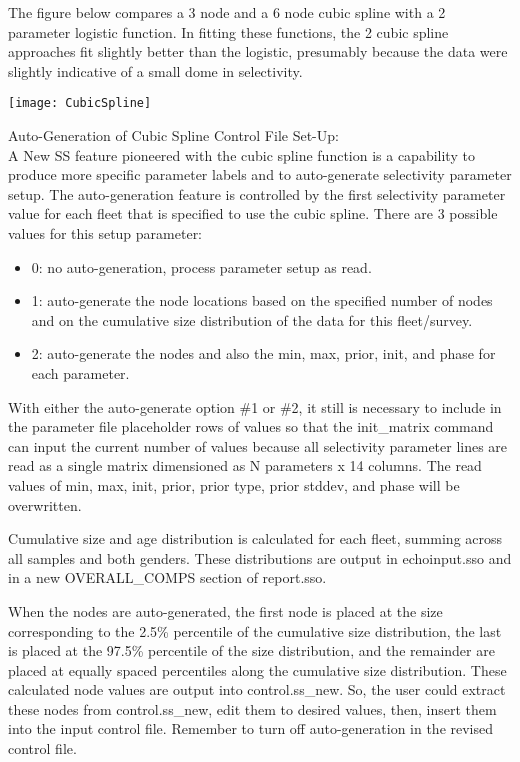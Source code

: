\begin{description}
	
	The figure below compares a 3 node and a 6 node cubic spline with a 2 parameter logistic function.  In fitting these functions, the 2 cubic spline approaches fit slightly better than the logistic, presumably because the data were slightly indicative of a small dome in selectivity.\\
	\begin{center}
		\texttt{[image: CubicSpline]}
	\end{center}
	
	Auto-Generation of Cubic Spline Control File Set-Up:\\
	A New SS feature pioneered with the cubic spline function is a capability to produce more specific parameter labels and to auto-generate selectivity parameter setup.  The auto-generation feature is controlled by the first selectivity parameter value for each fleet that is specified to use the cubic spline.  There are 3 possible values for this setup parameter:
	\begin{itemize}
		\item 0: no auto-generation, process parameter setup as read.
		\item 1: auto-generate the node locations based on the specified number of nodes and on the cumulative size distribution of the data for this fleet/survey.
		\item 2: auto-generate the nodes and also the min, max, prior, init, and phase for each parameter.
	\end{itemize}
	
	With either the auto-generate option \#1 or \#2, it still is necessary to include in the parameter file placeholder rows of values so that the init\_matrix command can input the current number of values because all selectivity parameter lines are read as a single matrix dimensioned as N parameters x 14 columns.  The read values of min, max, init, prior, prior type, prior stddev, and phase will be overwritten.
	
	Cumulative size and age distribution is calculated for each fleet, summing across all samples and both genders.  These distributions are output in echoinput.sso and in a new OVERALL\_COMPS section of report.sso.
	
	When the nodes are auto-generated, the first node is placed at the size corresponding to the 2.5\% percentile of the cumulative size distribution, the last is placed at the 97.5\% percentile of the size distribution, and the remainder are placed at equally spaced percentiles along the cumulative size distribution.  These calculated node values are output into control.ss\_new.  So, the user could extract these nodes from control.ss\_new, edit them to desired values, then, insert them into the input control file.  Remember to turn off auto-generation in the revised control file.
	

\end{description}

